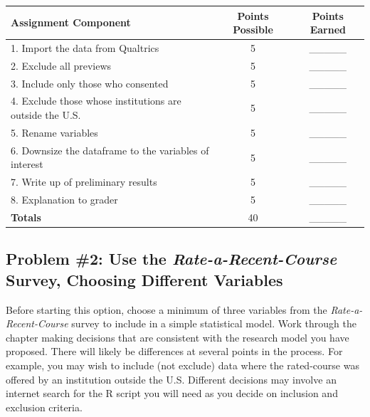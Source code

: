 \documentclass[
  english,
]{book}
\begin{document}
\begin{longtable}[]{@{}lcc@{}}
\toprule
Assignment Component & Points Possible & Points Earned \\
\midrule
\endhead
1. Import the data from Qualtrics & 5 & \_\_\_\_\_ \\
2. Exclude all previews & 5 & \_\_\_\_\_ \\
3. Include only those who consented & 5 & \_\_\_\_\_ \\
4. Exclude those whose institutions are outside the U.S. & 5 & \_\_\_\_\_ \\
5. Rename variables & 5 & \_\_\_\_\_ \\
6. Downsize the dataframe to the variables of interest & 5 & \_\_\_\_\_ \\
7. Write up of preliminary results & 5 & \_\_\_\_\_ \\
8. Explanation to grader & 5 & \_\_\_\_\_ \\
\textbf{Totals} & 40 & \_\_\_\_\_ \\
\bottomrule
\end{longtable}

\hypertarget{problem-2-use-the-rate-a-recent-course-survey-choosing-different-variables}{%
\subsection{\texorpdfstring{Problem \#2: Use the \emph{Rate-a-Recent-Course} Survey, Choosing Different Variables}{Problem \#2: Use the Rate-a-Recent-Course Survey, Choosing Different Variables}}\label{problem-2-use-the-rate-a-recent-course-survey-choosing-different-variables}}

Before starting this option, choose a minimum of three variables from the \emph{Rate-a-Recent-Course} survey to include in a simple statistical model. Work through the chapter making decisions that are consistent with the research model you have proposed. There will likely be differences at several points in the process. For example, you may wish to include (not exclude) data where the rated-course was offered by an institution outside the U.S. Different decisions may involve an internet search for the R script you will need as you decide on inclusion and exclusion criteria.
\end{document}
